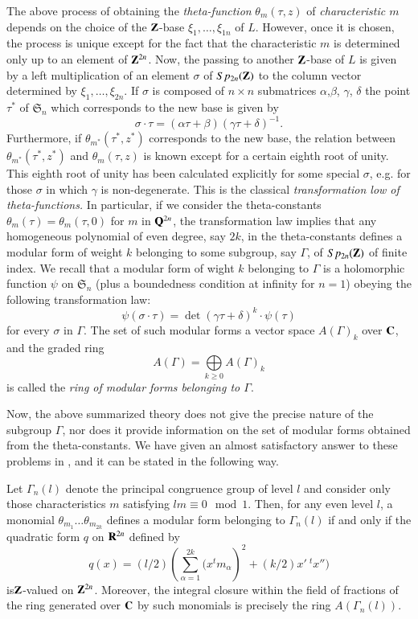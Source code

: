 The above process of obtaining the {\em theta-function} $\theta_{m}(\tau,z)$ of {\em characteristic $m$} depends on the choice of the $\mathbf{Z}$-base $\xi_{1},\ldots,\xi_{1n}$ of $L$. However, once it is chosen, the process is unique except for the fact that the characteristic $m$ is determined only up to an element of $\mathbf{Z}^{2n}$. Now, the passing to another $\mathbf{Z}$-base of $L$ is given by a left multiplication of an element $\sigma$ of $Sp_{2n}(\mathbf{Z})$ to the column vector determined by $\xi_{1},\ldots,\xi_{2n}$. If $\sigma$ is composed of $n\times n$ submatrices $\alpha$,\pageoriginale $\beta$, $\gamma$, $\delta$ the point $\tau^{*}$ of $\mathfrak{S}_{n}$ which corresponds to the new base is given by
$$
\sigma\cdot \tau=(\alpha \tau+\beta)(\gamma\tau+\delta)^{-1}.
$$
Furthermore, if $\theta_{m^{*}}(\tau^{*},z^{*})$ corresponds to the new base, the relation between $\theta_{m^{*}}(\tau^{*},z^{*})$ and $\theta_{m}(\tau,z)$ is known except for a certain eighth root of unity. This eighth root of unity has been calculated explicitly for some special $\sigma$, e.g. for those $\sigma$ in which $\gamma$ is non-degenerate. This is the classical {\em transformation low of theta-functions.} In particular, if we consider the theta-constants $\theta_{m}(\tau)=\theta_{m}(\tau,0)$ for $m$ in $\mathbf{Q}^{2n}$, the transformation law implies that any homogeneous polynomial of even degree, say $2k$, in the theta-constants defines a modular form of weight $k$ belonging to some subgroup, say $\Gamma$, of $Sp_{2n}(\mathbf{Z})$ of finite index. We recall that a modular form of wight $k$ belonging to $\Gamma$ is a holomorphic function $\psi$ on $\mathfrak{S}_{n}$ (plus a boundedness condition at infinity for $n=1$) obeying the following transformation law:
$$
\psi(\sigma\cdot \tau)=\det (\gamma\tau+\delta)^{k}\cdot \psi(\tau)
$$
for every $\sigma$ in $\Gamma$. The set of such modular forms a vector space $A(\Gamma)_{k}$ over $\mathbf{C}$, and the graded ring
$$
A(\Gamma)=\bigoplus\limits_{k\geq 0}A(\Gamma)_{k}
$$
is called the {\em ring of modular forms belonging to $\Gamma$}.

Now, the above summarized theory does not give the precise nature of the subgroup $\Gamma$, nor does it provide information on the set of modular forms obtained from the theta-constants. We have given an almost satisfactory answer to these problems in \cite{art12-key9}, and it can be stated in the following way.

Let $\Gamma_{n}(l)$ denote the principal congruence group of level $l$ and consider only those characteristics $m$ satisfying $lm\equiv 0\mod 1$. Then, for any even level $l$, a monomial $\theta_{m_{1}}\ldots \theta_{m_{2k}}$ defines a modular form belonging to $\Gamma_{n}(l)$ if and only if the quadratic form $q$ on $\mathbf{R}^{2n}$ defined by
$$
q(x)=(l/2)\left(\sum\limits^{2k}_{\alpha=1}(x^{t}m_{\alpha}\right)^{2}+(k/2)x' \ {}^{t}x'')
$$
is\pageoriginale $\mathbf{Z}$-valued on $\mathbf{Z}^{2n}$. Moreover, the integral closure within the field of fractions of the ring generated over $\mathbf{C}$ by such monomials is precisely the ring $A(\Gamma_{n}(l))$.


